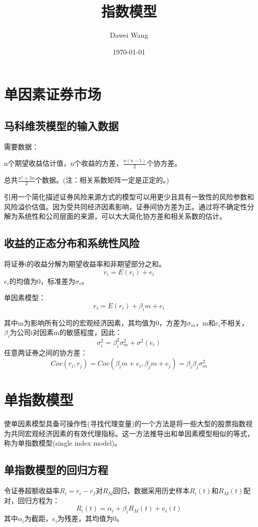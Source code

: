 \documentclass{article}
\title{指数模型}
\author{Dawei Wang}
\date{\today}
\begin{document}
	\maketitle
\section{单因素证券市场}
\subsection{马科维茨模型的输入数据}
需要数据：

n个期望收益估计值，n个收益的方差，$ \frac{n(n-1)}{2} $个协方差。

总共$ \frac{n^2+3n}{2} $个数据。(注：相关系数矩阵一定是正定的。)

引用一个简化描述证券风险来源方式的模型可以用更少且具有一致性的风险参数和风险溢价估值。因为受共同经济因素影响，证券间协方差为正。通过将不确定性分解为系统性和公司层面的来源，可以大大简化协方差和相关系数的估计。
  
\subsection{收益的正态分布和系统性风险}

将证券i的收益分解为期望收益率和非期望部分之和。
\[
r_i=E(r_i)+e_i
\]
$ e_i $的均值为0，标准差为$ \sigma_i $。

单因素模型：
\[
r_i=E(r_i)+\beta_im+e_i
\]

其中m为影响所有公司的宏观经济因素，其均值为0，方差为$ \sigma_m $，m和$ e_i $不相关，$ \beta_i $为公司i对因素m的敏感程度，因此：
\[
\sigma_i^2=\beta_i^2\sigma_m^2+\sigma^2(e_i)
\]
任意两证券之间的协方差：
\[
Cov(r_i,r_j)=Cov(\beta_im+e_i,\beta_jm+e_j)=\beta_i\beta_j\sigma_m^2
\]

\section{单指数模型}
使单因素模型具备可操作性(寻找代理变量)的一个方法是将一些大型的股票指数视为共同宏观经济因素的有效代理指标。这一方法推导出和单因素模型相似的等式，称为单指数模型(single index model)。

\subsection{单指数模型的回归方程}
令证券超额收益率$ R_i=r_i-r_f $对$ R_M $回归，数据采用历史样本$ R_i(t) $和$ R_M(t) $配对，回归方程为：
\[
R_i(t)=\alpha_i+\beta_iR_M(t)+e_i(t)
\]
其中$ \alpha_i $为截距，$ e_i $为残差，其均值为0。
\end{document}
